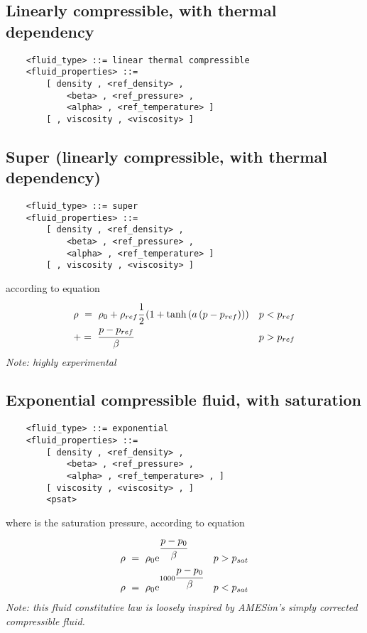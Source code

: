 \subsection{Linearly compressible, with thermal dependency}
\begin{verbatim}
    <fluid_type> ::= linear thermal compressible
    <fluid_properties> ::=
        [ density , <ref_density> ,
            <beta> , <ref_pressure> ,
            <alpha> , <ref_temperature> ]
        [ , viscosity , <viscosity> ]
\end{verbatim}

\subsection{Super (linearly compressible, with thermal dependency)}
\begin{verbatim}
    <fluid_type> ::= super
    <fluid_properties> ::=
        [ density , <ref_density> ,
            <beta> , <ref_pressure> ,
            <alpha> , <ref_temperature> ]
        [ , viscosity , <viscosity> ]
\end{verbatim}
according to equation
\begin{displaymath}
	\matr{ll}{
		\rho \ = \ \rho_0 + \rho_{ref}\cfrac{1}{2}\plbr{
			1 + \llk{tanh}\plbr{a\plbr{p-p_{ref}}}
		} & p < p_{ref} \\
		+= \ \cfrac{p-p_{ref}}{\beta} & p > p_{ref}
	}
\end{displaymath}
\emph{Note: highly experimental}

\subsection{Exponential compressible fluid, with saturation}
\begin{verbatim}
    <fluid_type> ::= exponential
    <fluid_properties> ::=
        [ density , <ref_density> ,
            <beta> , <ref_pressure> ,
            <alpha> , <ref_temperature> , ]
        [ viscosity , <viscosity> , ]
        <psat>
\end{verbatim}
where  is the saturation pressure, according to equation
\begin{displaymath}
	\matr{ll}{
		\rho \ = \ \rho_0 \e{\cfrac{p-p_0}{\beta}} &
		p > p_{sat} \\
		\rho \ = \ \rho_0 \e{1000\cfrac{p-p_0}{\beta}} &
		p < p_{sat}
	}
\end{displaymath}
\emph{Note: this fluid constitutive law is loosely inspired by AMESim's
simply corrected compressible fluid.}



